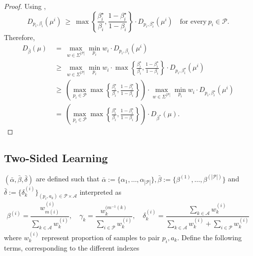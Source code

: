 \documentclass{article}
\begin{document}
\begin{proof}
    Using \cite[Theorem 1, Statement 3]{russo2020simple}, 
\[D_{p_i,\beta_i}(\mu^i)~\geq~\max\left\{\frac{\beta_i^\star}{\beta_i},\frac{1-\beta_i^\star}{1-\beta_i}\right\}\cdot D_{p_i,\beta_i^\star}(\mu^i)\quad \text{for every}~p_i\in \mathcal{P}.\]
Therefore, 
\begin{align*}
    D_{\bar{\beta}}(\mu)~&=~\max_{w\in \Sigma^{|\mathcal{P}|}}\min_{p_i} w_i \cdot D_{p_i,\beta_i}(\mu^i)\\
    &\geq~\max_{w\in \Sigma^{|\mathcal{P}|}}\min_{p_i} w_i \cdot \max\left\{\frac{\beta_i^\star}{\beta_i},\frac{1-\beta_i^\star}{1-\beta_i}\right\}\cdot D_{p_i,\beta_i^\star}(\mu^i)\\
    ~&\geq~\left(\max_{p_i\in \mathcal{P}}\max\left\{\frac{\beta_i^\star}{\beta_i},\frac{1-\beta_i^\star}{1-\beta_i}\right\}\right)\cdot\max_{w\in \Sigma^{|\mathcal{P}|}}\min_{p_i} w_i \cdot D_{p_i,\beta_i^\star}(\mu^i)\\
    ~&=~\left(\max_{p_i\in \mathcal{P}}\max\left\{\frac{\beta_i^\star}{\beta_i},\frac{1-\beta_i^\star}{1-\beta_i}\right\}\right)\cdot D_{\bar{\beta}^\star}(\mu).
\end{align*}    
\end{proof}
\clearpage
\subsection{Two-Sided Learning}

$(\bar{\alpha},\bar{\beta},\bar{\delta})$ are defined such that $\bar{\alpha}:=\{\alpha_1,\ldots,\alpha_{|\mathcal{P}|}\}, \bar{\beta}:=\{\beta^{(1)},\ldots,\beta^{(|\mathcal{P}|)}\}$ and $\bar{\delta}:=\{\delta^{(i)}_k\}_{(p_i,a_k)\in\mathcal{P}\times \mathcal{A}}$ interpreted as
\begin{align*}
    \beta^{(i)} = \dfrac{w^{(i)}_{m(i)}}{\sum_{k\in\mathcal{A}}w^{(i)}_k}, \quad \gamma_k = \dfrac{w^{(m^{-1}(k)}_k}{\sum_{i\in\mathcal{P}}w^{(i)}_k},\quad \delta^{(i)}_k = \dfrac{\sum_{k\in\mathcal{A}}w^{(i)}_k}{\sum_{k\in\mathcal{A}}w^{(i)}_k+\sum_{i\in\mathcal{P}}w^{(i)}_k}
\end{align*}
where $w^{(i)}_k$ represent proportion of samples to pair $p_i,a_k$. Define the following terms, corresponding to the different indexes
\end{document}
